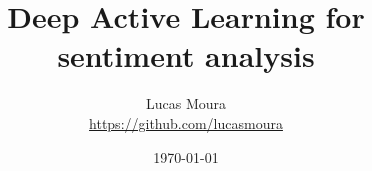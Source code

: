 \title{Deep Active Learning for sentiment analysis}
\date{\today}

\author{
  Lucas Moura\\
  \url{https://github.com/lucasmoura}
  \vspace{0.4 cm}
}

